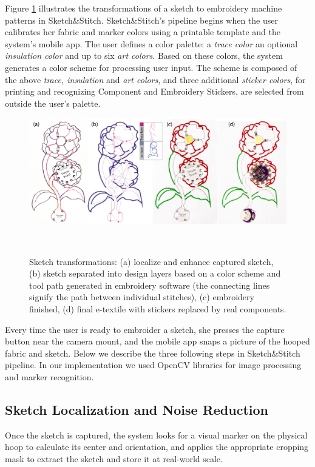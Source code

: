Figure \ref{fig:Flowers} illustrates the transformations of a sketch to embroidery machine patterns in Sketch\&Stitch. 
Sketch\&Stitch's pipeline begins when the user calibrates her fabric and marker colors using a printable template and the system's mobile app. The user defines a color palette: a \textit{trace color} an optional \textit{insulation color} and up to six \textit{art colors}. Based on these colors, the system generates a color scheme for processing user input. The scheme is composed of the above \textit{trace, insulation} and \textit{art colors}, and three additional \textit{sticker colors}, for printing and recognizing Component and Embroidery Stickers, are selected from outside the user's palette.

\begin{figure} [t!]
\centering
  \includegraphics[width=1\columnwidth]{figures/Flowers}
  \caption{Sketch transformations: (a) localize and enhance captured sketch, (b) sketch separated into design layers based on a color scheme and tool path generated in embroidery software (the connecting lines signify the path between individual stitches), (c) embroidery finished, (d) final e-textile with stickers replaced by real components.}~\label{fig:Flowers}
  \vspace{-2.5em}
  \end{figure}

Every time the user is ready to embroider a sketch, she presses the capture button near the camera mount, and the mobile app snaps a picture of the hooped fabric and sketch. Below we describe the three following steps in Sketch\&Stitch pipeline. In our implementation we used OpenCV libraries for image processing and marker recognition. 

\subsection{Sketch Localization and Noise Reduction}
Once the sketch is captured, the system looks for a visual marker on the physical hoop to calculate its center and orientation, and applies the appropriate cropping mask to extract the sketch and store it at real-world scale.

